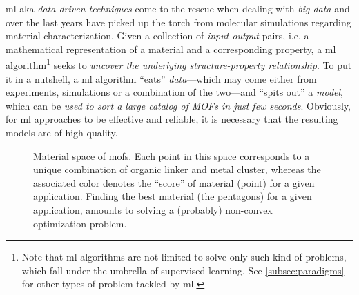 \Gls{ml} aka \emph{data-driven
techniques} come to the rescue when dealing with \emph{big data}
and over the last years have picked up the torch from molecular simulations
regarding material characterization. Given a collection of
\emph{input-output} pairs, i.e. a mathematical
representation of a material and a corresponding property, a \gls{ml}
algorithm\footnote{Note that \gls{ml}
algorithms are not limited to solve only such kind of problems, which fall under
the umbrella of supervised learning. See \Section{}
\ref{subsec:paradigms} for other types of problem tackled by \gls{ml}.} seeks to
\emph{uncover the underlying structure-property relationship}. To put it in a
nutshell, a \gls{ml} algorithm ``eats'' \emph{data}---which may come
either from experiments, simulations or a combination of the two---and ``spits
out'' a \emph{model}, which can be \emph{used to sort a large
catalog of MOFs in just few seconds}. Obviously, for \gls{ml} approaches to be
effective and reliable, it is necessary that the resulting models are of high
quality.

\begin{figure}
	\centering
	\caption[Material space of .]{Material space of \glspl{mof}. Each point in this space corresponds to a unique
	combination of organic linker and metal cluster, whereas the associated
	color denotes the ``score'' of material (point) for a given application.
	Finding the best material (the pentagons) for a given application, amounts
	to solving a (probably) non-convex optimization problem.}
	\label{fig:mofs_space}
\end{figure}

